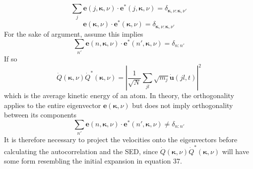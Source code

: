 \documentclass[aps,prb,preprint,preprintnumbers,amsmath,amssymb,floatfix,superscriptaddress]{revtex4}
\begin{document}
\begin{equation}
\sum_{j}\pmb{e}(j,\pmb{\kappa},\nu)\cdot\pmb{e}^*(j,\pmb{\kappa},\nu)= \delta_{\pmb{\kappa},\nu:\pmb{\kappa},\nu'}
\end{equation}
\begin{equation}
\pmb{e}(\pmb{\kappa},\nu)\cdot\pmb{e}^*(\pmb{\kappa},\nu)= \delta_{\pmb{\kappa},\nu:\pmb{\kappa},\nu'}
\end{equation}
For the sake of argument, assume this implies
\begin{equation}
\sum_{n'}\pmb{e}(n,\pmb{\kappa},\nu)\cdot\pmb{e}^*(n',\pmb{\kappa},\nu)=\delta_{n:n'}
\end{equation}
If so
\begin{equation}
\dot{Q}(\pmb{\kappa},\nu)\dot{Q}^*(\pmb{\kappa},\nu)=|\frac{1}{\sqrt{N}}\sum_{jl}\sqrt{m_j}\dot{\pmb{u}}(jl,t)|^2
\end{equation}
which is the average kinetic energy of an atom. In theory, the orthogonality applies to the entire eigenvector $\pmb{e}(\pmb{\kappa},\nu)$ but does not imply orthogonality between its components
\begin{equation}
\sum_{n'}\pmb{e}(n,\pmb{\kappa},\nu)\cdot\pmb{e}^*(n',\pmb{\kappa},\nu)\neq\delta_{n:n'}
\end{equation}
It is therefore necessary to project the velocities onto the eigenvectors before calculating the autocorrelation and the SED, since $\dot{Q}(\pmb{\kappa},\nu)\dot{Q}^*(\pmb{\kappa},\nu)$ will have some form resembling the initial expansion in equation 37.

\newpage
%

\end{document}
